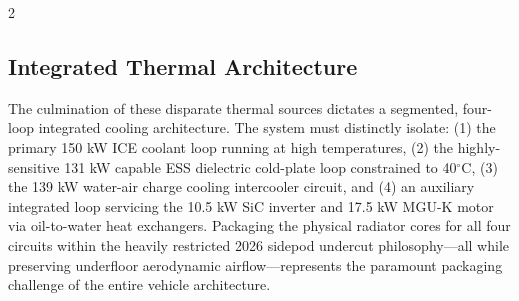 \begin{multicols}{2}
\subsection{Integrated Thermal Architecture}

The culmination of these disparate thermal sources dictates a segmented, four-loop integrated cooling architecture. The system must distinctly isolate: (1) the primary 150 kW ICE coolant loop running at high temperatures, (2) the highly-sensitive 131 kW capable ESS dielectric cold-plate loop constrained to 40$^\circ$C, (3) the 139 kW water-air charge cooling intercooler circuit, and (4) an auxiliary integrated loop servicing the 10.5 kW SiC inverter and 17.5 kW MGU-K motor via oil-to-water heat exchangers. Packaging the physical radiator cores for all four circuits within the heavily restricted 2026 sidepod undercut philosophy—all while preserving underfloor aerodynamic airflow—represents the paramount packaging challenge of the entire vehicle architecture.
\end{multicols}
